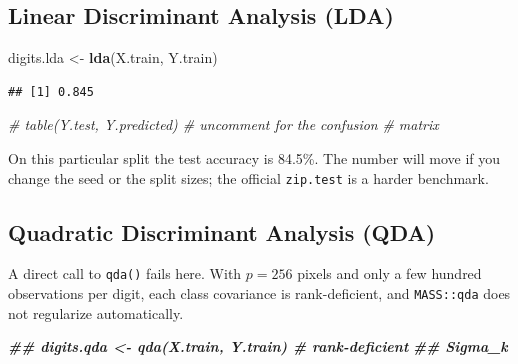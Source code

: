 \documentclass[
]{book}
\newenvironment{Shaded}{\begin{snugshade}}{\end{snugshade}}
\newcommand{\CommentTok}[1]{\textcolor[rgb]{0.56,0.35,0.01}{\textit{#1}}}
\newcommand{\DocumentationTok}[1]{\textcolor[rgb]{0.56,0.35,0.01}{\textbf{\textit{#1}}}}
\newcommand{\FunctionTok}[1]{\textcolor[rgb]{0.13,0.29,0.53}{\textbf{#1}}}
\newcommand{\NormalTok}[1]{#1}
\newcommand{\OtherTok}[1]{\textcolor[rgb]{0.56,0.35,0.01}{#1}}
\newcommand{\SpecialCharTok}[1]{\textcolor[rgb]{0.81,0.36,0.00}{\textbf{#1}}}
\begin{document}
\subsection*{Linear Discriminant Analysis (LDA)}\label{linear-discriminant-analysis-lda}

\begin{Shaded}
\begin{Highlighting}[]
\NormalTok{digits.lda }\OtherTok{\textless{}{-}} \FunctionTok{lda}\NormalTok{(X.train, Y.train)}
\end{Highlighting}
\end{Shaded}

\begin{Shaded}
\end{Shaded}

\begin{verbatim}
## [1] 0.845
\end{verbatim}

\begin{Shaded}
\begin{Highlighting}[]
\CommentTok{\# table(Y.test, Y.predicted) \# uncomment for the confusion}
\CommentTok{\# matrix}
\end{Highlighting}
\end{Shaded}

On this particular split the test accuracy is 84.5\%. The number will move if you change the seed or the split sizes; the official \texttt{zip.test} is a harder benchmark.

\subsection*{Quadratic Discriminant Analysis (QDA)}\label{quadratic-discriminant-analysis-qda}

A direct call to \texttt{qda()} fails here. With \(p = 256\) pixels and only a few hundred observations per digit, each class covariance is rank-deficient, and \texttt{MASS::qda} does not regularize automatically.

\begin{Shaded}
\begin{Highlighting}[]
\DocumentationTok{\#\# digits.qda \textless{}{-} qda(X.train, Y.train) \# rank{-}deficient}
\DocumentationTok{\#\# Sigma\_k}
\end{Highlighting}
\end{Shaded}
\end{document}
